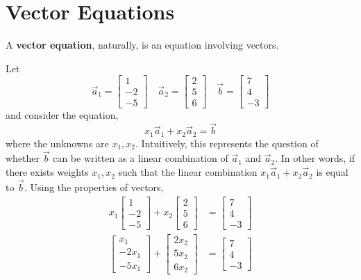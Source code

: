 \documentclass[letterpaper,12pt]{article}
\begin{document}
\section*{Vector Equations}
A \textbf{vector equation}, naturally, is an equation involving vectors.

\begin{example}
Let
\begin{equation*}
    \vec{a}_1 = \begin{bmatrix} 1 \\ -2 \\ -5 \end{bmatrix} \quad \vec{a}_2 = \begin{bmatrix} 2 \\ 5 \\ 6 \end{bmatrix} \quad \vec{b} = \begin{bmatrix} 7 \\ 4 \\ -3 \end{bmatrix}
\end{equation*}
and consider the equation,
\begin{equation*}
    x_1 \vec{a}_1 + x_2 \vec{a}_2 = \vec{b}
\end{equation*}
where the unknowns are $x_1, x_2$. Intuitively, this represents the question of whether $\vec{b}$ can be written as a linear combination of $\vec{a}_1$ and $\vec{a}_2$. In other words, if there exists weights $x_1, x_2$ such that the linear combination $x_1 \vec{a}_1 + x_2 \vec{a}_2$ is equal to $\vec{b}$. Using the properties of vectors,
\begin{align*}
    x_1 \begin{bmatrix} 1 \\ -2 \\ -5 \end{bmatrix} + x_2 \begin{bmatrix} 2 \\ 5 \\ 6 \end{bmatrix} & = \begin{bmatrix} 7 \\ 4 \\ -3 \end{bmatrix} \\
    \begin{bmatrix} x_1 \\ -2x_1 \\ -5x_1 \end{bmatrix} + \begin{bmatrix} 2x_2 \\ 5x_2 \\ 6x_2 \end{bmatrix} & = \begin{bmatrix} 7 \\ 4 \\ -3 \end{bmatrix} \\

\end{align*}
\end{example}
\end{document}
